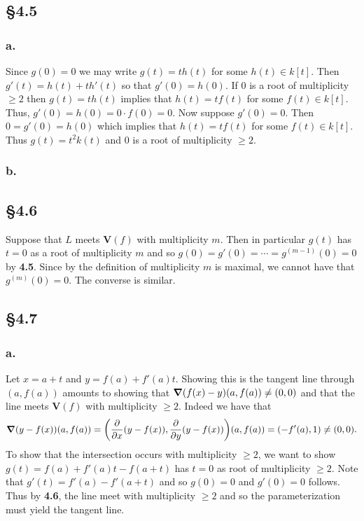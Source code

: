 \documentclass[letterpaper]{article}
\begin{document}
\subsection*{\S 4.5}

\subsubsection*{a.}

Since $g(0) = 0$ we may write $g(t) = t h(t)$ for some $h(t) \in k[t]$.
Then $g'(t) = h(t) + t h'(t)$ so that $g'(0) = h(0)$.
If $0$ is a root of multiplicity $\geq 2$ then $g(t) = t h(t)$ implies that $h(t) = t f(t)$ for some $f(t) \in k[t]$.
Thus, $g'(0) = h(0) = 0 \cdot f(0) = 0$.
Now suppose $g'(0) = 0$.
Then $0 = g'(0) = h(0)$ which implies that $h(t) = t f(t)$ for some $f(t) \in k[t]$.
Thus $g(t) = t^{2} k(t)$ and $0$ is a root of multiplicity $\geq 2$.

\subsubsection*{b.}


\subsection*{\S 4.6}

Suppose that $L$ meets $\mathbf{V}(f)$ with multiplicity $m$.
Then in particular $g(t)$ has $t = 0$ as a root of multiplicity $m$ and so $g(0) = g'(0) = \cdots = g^{(m - 1)}(0) = 0$ by \textbf{4.5}.
Since by the definition of multiplicity $m$ is maximal, we cannot have that $g^{(m)}(0) = 0$.
The converse is similar.

\subsection*{\S 4.7}

\subsubsection*{a.}

Let $x = a + t$ and $y = f(a) + f'(a)t$.
Showing this is the tangent line through $(a, f(a))$ amounts to showing that $\grad(f(x) - y)(a, f(a)) \neq (0, 0)$ and that the line meets $\mathbf{V}(f)$ with multiplicity $\geq 2$.
Indeed we have that
\[
 \grad(y - f(x))(a, f(a)) = \pqty{\frac{\partial}{\partial x}(y - f(x)), \frac{\partial}{\partial y}(y - f(x))}(a, f(a)) = (-f'(a), 1) \neq (0, 0).
\]
To show that the intersection occurs with multiplicity $\geq 2$, we want to show $g(t) = f(a) + f'(a) t - f(a + t)$ has $t = 0$ as root of multiplicity $\geq 2$.
Note that $g'(t) = f'(a) - f'(a + t)$ and so $g(0) = 0$ and $g'(0) = 0$ follows.
Thus by \textbf{4.6}, the line meet with multiplicity $\geq 2$ and so the parameterization must yield the tangent line.
\end{document}
